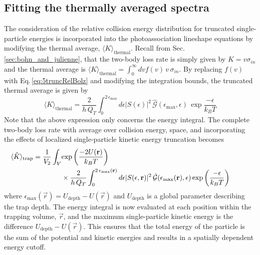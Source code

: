 \subsection{Fitting the thermally averaged spectra} \label{sec:lowIntSpectra}

The consideration of the relative collision energy distribution for truncated single-particle energies is incorporated into the photoassociation lineshape equations by modifying the thermal average, $\langle K \rangle_\text{thermal}$.
Recall from Sec.\,\ref{sec:bohn_and_julienne}, that the two-body loss rate is simply given by $K= v \sigma_{in}$ and the thermal average is $\langle K \rangle_{\text{thermal}} = \displaystyle \int_0^{\infty} dv f(v)\,v\,\sigma_{in}$.
By replacing $f(v)$ with Eq.\,\ref{eq:5truncRelBolz} and modifying the integration bounds, the truncated thermal average is given by
\begin{equation}
	\langle K \rangle_\text{thermal} = \frac{2}{h\,Q_{T}} \int_{0}^{2\,\epsilon_{\text{max}}} d\epsilon \vert S(\epsilon) \vert^2 \, \hat{\mathcal{G}}(\epsilon_\text{max}, \epsilon)\,\exp{\frac{-\epsilon}{k_{B}T}}
\end{equation}
Note that the above expression only concerns the energy integral.
The complete two-body loss rate with average over collision energy, space, and incorporating the effects of localized single-particle kinetic energy truncation becomes
\begin{align} \label{eq:chap5avgTruncK}
\hspace*{-1cm} 
	\langle \hat{K} \rangle_\text{trap} = \frac{1}{V_2} \int_V &\exp{\frac{-2 U(\vec{r})}{k_{B}T}} \\ 
	\nonumber
	&\times \frac{2}{h\,Q_{T}} \int_{0}^{2\,\epsilon_{\text{max}}(\vec{r})} d\epsilon \vert S(\epsilon, \vec{r}) \vert^2 \,\hat{\mathcal{G}} ( \epsilon_\text{max}(\vec{r}), \epsilon)  \,\exp{\frac{-\epsilon}{k_{B}T}}
\end{align}
where $\epsilon_\text{max}(\vec{r}) = U_\text{depth}-U(\vec{r})$ and $U_\text{depth}$ is a global parameter describing the trap depth.
The energy integral is now evaluated at each position within the trapping volume, $\vec{r}$, and the maximum single-particle kinetic energy is the difference $U_{\text{depth}} - U(\vec{r})$.
This ensures that the total energy of the particle is the sum of the potential and kinetic energies and results in a spatially dependent energy cutoff.

